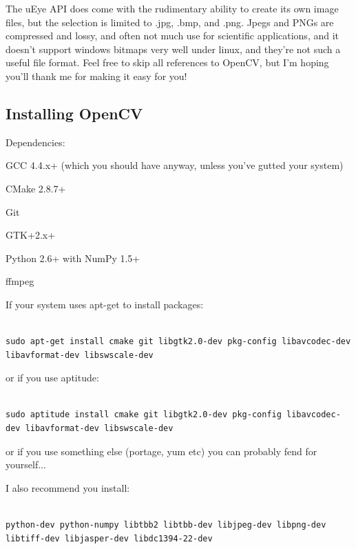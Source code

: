 \documentclass[12pt,a4paper]{article}
\begin{document}
The uEye API does come with the rudimentary ability to create its own image files, but the selection is limited to .jpg, .bmp, and .png. Jpegs and PNGs are compressed and lossy, and often not much use for scientific applications, and it doesn't support windows bitmaps very well under linux, and they're not such a useful file format. Feel free to skip all references to OpenCV, but I'm hoping you'll thank me for making it easy for you!


\subsection{Installing OpenCV}

Dependencies:

GCC 4.4.x+ (which you should have anyway, unless you've gutted your system)

CMake 2.8.7+

Git

GTK+2.x+

Python 2.6+ with NumPy 1.5+

ffmpeg

If your system uses apt-get to install packages:

\lstset{language=bash}
\begin{lstlisting}

sudo apt-get install cmake git libgtk2.0-dev pkg-config libavcodec-dev libavformat-dev libswscale-dev

\end{lstlisting}

or if you use aptitude:

\lstset{language=bash}
\begin{lstlisting}

sudo aptitude install cmake git libgtk2.0-dev pkg-config libavcodec-dev libavformat-dev libswscale-dev

\end{lstlisting}

or if you use something else (portage, yum etc) you can probably fend for yourself...

I also recommend you install:

\lstset{language=bash}
\begin{lstlisting}

python-dev python-numpy libtbb2 libtbb-dev libjpeg-dev libpng-dev libtiff-dev libjasper-dev libdc1394-22-dev

\end{lstlisting}
\end{document}
